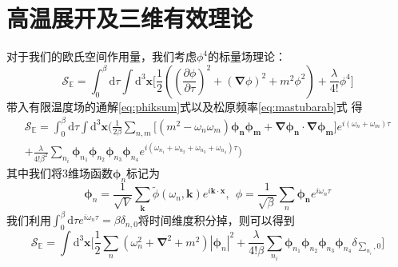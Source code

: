 \section{高温展开及三维有效理论}
对于我们的欧氏空间作用量，我们考虑$\phi^4$的标量场理论：
\begin{equation}
    \mathcal{S}_\mathbb{E} = \int_0^\beta \mathrm{d}\tau \int\mathrm{d}^3 \boldsymbol{x} \Big[ \frac{1}{2}\left(\left( \frac{\partial \phi }{\partial\tau} \right)^2 + (\boldsymbol{\nabla}\phi)^2+m^2 \phi^2\right) + \frac{\lambda}{4!}\phi^4 \Big]
\end{equation}
带入有限温度场的通解\eqref{eq:phiksum}式以及松原频率\eqref{eq:mastubarab}式
得
\begin{multline}
    \mathcal{S}_\mathbb{E} = \int_0^\beta \mathrm{d}\tau \int\mathrm{d}^3 \boldsymbol{x} \Big( \frac{1}{2\beta}\sum_{n,m}\Big[ \left(m^2-\omega_n\omega_m \right)\boldsymbol{\phi_n}\boldsymbol{\phi_m} + \boldsymbol{\nabla}\boldsymbol{\phi_n} \cdot\boldsymbol{\nabla}\boldsymbol{\phi_m} \Big]e^{i(\omega_n+\omega_m)\tau} \\+ \frac{\lambda}{4! \beta^2}\sum_{n_i}\boldsymbol{\phi}_{n_1}\boldsymbol{\phi}_{n_2}\boldsymbol{\phi}_{n_3}\boldsymbol{\phi}_{n_4} e^{i(\omega_{n_1}+\omega_{n_2}+\omega_{n_3}+\omega_{n_4})\tau}\Big)
\end{multline}
其中我们将3维场函数$\boldsymbol{\phi}_n$标记为
\begin{equation}
    \boldsymbol{\phi}_n = \frac{1}{\sqrt{V}}\sum_{\boldsymbol{k} }\tilde{\phi}(\omega_n,\boldsymbol{k}) e^{i\boldsymbol{k}\cdot\boldsymbol{x}},~~\phi = \frac{1}{\sqrt{\beta}}\sum_n \boldsymbol{\phi_n}e^{i\omega_n\tau}
\end{equation}
我们利用$\int_0^\beta \mathrm{d}\tau e^{i\omega_n \tau} = \beta \delta_{n,0}$将时间维度积分掉，则可以得到
\begin{equation}
     \mathcal{S}_\mathbb{E} =\int\mathrm{d}^3 \boldsymbol{x} \Big[\frac{1}{2}\sum_n (\omega_n^2+\boldsymbol{\nabla}^2 + m^2)|\boldsymbol{\phi}_n|^2 + \frac{\lambda}{4! \beta}\sum_{n_i} \boldsymbol{\phi}_{n_1}\boldsymbol{\phi}_{n_2}\boldsymbol{\phi}_{n_3}\boldsymbol{\phi}_{n_4} \delta_{\sum_{n_i},0}\Big]
\end{equation}
